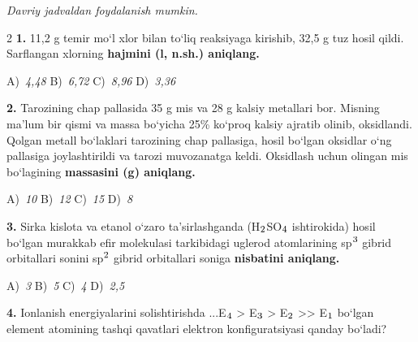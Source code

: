 \documentclass[11pt,a4paper]{article}
\renewcommand{\normalsize}{\fontsize{10.9}{13.4}\selectfont}
\renewcommand{\textsubscript}[1]{\ensuremath{_{\text{\fontsize{8}{8}\selectfont #1}}}}
\renewcommand{\textsuperscript}[1]{\ensuremath{^{\text{\fontsize{8}{8}\selectfont #1}}}}
\begin{document}
\normalsize
\thispagestyle{first}
\noindent{}
\par\medskip
\noindent\textit{Davriy jadvaldan foydalanish mumkin.}
\par\medskip
\begin{multicols}{2}
\noindent\textbf{1.} 11,2 g temir mo`l xlor bilan to`liq reaksiyaga kirishib, 32,5 g tuz hosil qildi. Sarflangan xlorning \textbf{hajmini (l, n.sh.) aniqlang.}

\noindent A)~\textsl{4,48} \hfill B)~\textsl{6,72} \hfill C)~\textsl{8,96} \hfill D)~\textsl{3,36}\par
\vspace{4pt}
\noindent\textbf{2.} Tarozining chap pallasida 35 g mis va 28 g kalsiy metallari bor. Misning ma'lum bir qismi va massa bo`yicha 25\% ko`proq kalsiy ajratib olinib, oksidlandi. Qolgan metall bo`laklari tarozining chap pallasiga, hosil bo`lgan oksidlar o`ng pallasiga joylashtirildi va tarozi muvozanatga keldi. Oksidlash uchun olingan mis bo`lagining \textbf{massasini (g) aniqlang.}

\noindent A)~\textsl{10} \hfill B)~\textsl{12} \hfill C)~\textsl{15} \hfill D)~\textsl{8}\par
\vspace{4pt}
\noindent\textbf{3.} Sirka kislota va etanol o`zaro ta'sirlashganda (H\textsubscript{2}SO\textsubscript{4} ishtirokida) hosil bo`lgan murakkab efir molekulasi tarkibidagi uglerod atomlarining sp\textsuperscript{3} gibrid orbitallari sonini sp\textsuperscript{2} gibrid orbitallari soniga \textbf{nisbatini aniqlang.}

\noindent A)~\textsl{3} \hfill B)~\textsl{5} \hfill C)~\textsl{4} \hfill D)~\textsl{2,5}\par
\vspace{4pt}
\noindent\textbf{4.} Ionlanish energiyalarini solishtirishda ...E\textsubscript{4} > E\textsubscript{3} > E\textsubscript{2} >> E\textsubscript{1} bo`lgan element atomining tashqi qavatlari elektron konfiguratsiyasi qanday bo`ladi?


\end{multicols}
\end{document}
